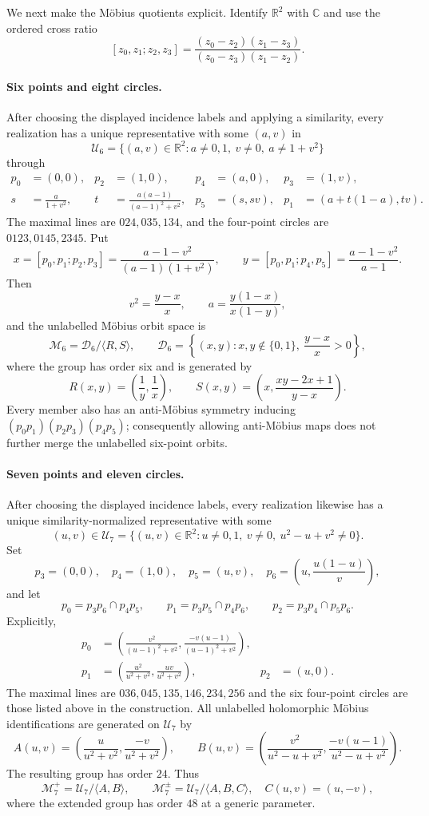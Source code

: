 \documentclass[11pt,a4paper]{article}
\theoremstyle{definition}
\begin{document}
We next make the Möbius quotients explicit.  Identify $\mathbb R^2$ with
$\mathbb C$ and use the ordered cross ratio
\[
 [z_0,z_1;z_2,z_3]
 =\frac{(z_0-z_2)(z_1-z_3)}{(z_0-z_3)(z_1-z_2)}.
\]

\paragraph{Six points and eight circles.}
After choosing the displayed incidence labels and applying a similarity, every
realization has a unique representative with some $(a,v)$ in
\[
 \mathcal U_6=\{(a,v)\in\mathbb R^2:
 a\ne0,1,\ v\ne0,\ a\ne1+v^2\}
\]
through
\[
\begin{aligned}
p_0&=(0,0),&p_2&=(1,0),&p_4&=(a,0),&p_3&=(1,v),\\
s&=\frac{a}{1+v^2},&
t&=\frac{a(a-1)}{(a-1)^2+v^2},&
p_5&=(s,sv),&p_1&=(a+t(1-a),tv).
\end{aligned}
\]
The maximal lines are $024,035,134$, and the four-point circles are
$0123,0145,2345$.  Put
\[
x=[p_0,p_1;p_2,p_3]
=\frac{a-1-v^2}{(a-1)(1+v^2)},\qquad
y=[p_0,p_1;p_4,p_5]
=\frac{a-1-v^2}{a-1}.
\]
Then
\[
v^2=\frac{y-x}{x},\qquad
a=\frac{y(1-x)}{x(1-y)},
\]
and the unlabelled Möbius orbit space is
\[
 \mathcal M_6=
 \mathcal D_6/\langle R,S\rangle,
 \qquad
 \mathcal D_6=\left\{(x,y):x,y\notin\{0,1\},\ \frac{y-x}{x}>0\right\},
\]
where the group has order six and is generated by
\[
 R(x,y)=\left(\frac1y,\frac1x\right),\qquad
 S(x,y)=\left(x,\frac{xy-2x+1}{y-x}\right).
\]
Every member also has an anti-Möbius symmetry inducing
$(p_0p_1)(p_2p_3)(p_4p_5)$; consequently allowing anti-Möbius maps does not
further merge the unlabelled six-point orbits.

\paragraph{Seven points and eleven circles.}
After choosing the displayed incidence labels, every realization likewise has a
unique similarity-normalized representative with some
\[
 (u,v)\in\mathcal U_7=
 \{(u,v)\in\mathbb R^2:u\ne0,1,\ v\ne0,\ u^2-u+v^2\ne0\}.
\]
Set
\[
 p_3=(0,0),\quad p_4=(1,0),\quad p_5=(u,v),\quad
 p_6=\left(u,\frac{u(1-u)}v\right),
\]
and let
\[
p_0=p_3p_6\cap p_4p_5,\qquad
p_1=p_3p_5\cap p_4p_6,\qquad
p_2=p_3p_4\cap p_5p_6.
\]
Explicitly,
\[
\begin{aligned}
p_0&=\left(\frac{v^2}{(u-1)^2+v^2},
           \frac{-v(u-1)}{(u-1)^2+v^2}\right),\\
p_1&=\left(\frac{u^2}{u^2+v^2},\frac{uv}{u^2+v^2}\right),
&p_2&=(u,0).
\end{aligned}
\]
The maximal lines are $036,045,135,146,234,256$ and the six four-point
circles are those listed above in the construction.  All unlabelled holomorphic
Möbius identifications are generated on $\mathcal U_7$ by
\[
A(u,v)=\left(\frac{u}{u^2+v^2},\frac{-v}{u^2+v^2}\right),\qquad
B(u,v)=\left(\frac{v^2}{u^2-u+v^2},
             \frac{-v(u-1)}{u^2-u+v^2}\right).
\]
The resulting group has order $24$.  Thus
\[
 \mathcal M_7^+=\mathcal U_7/\langle A,B\rangle,
 \qquad
 \mathcal M_7^{\pm}=\mathcal U_7/\langle A,B,C\rangle,
 \quad C(u,v)=(u,-v),
\]
where the extended group has order $48$ at a generic parameter.
\end{document}
